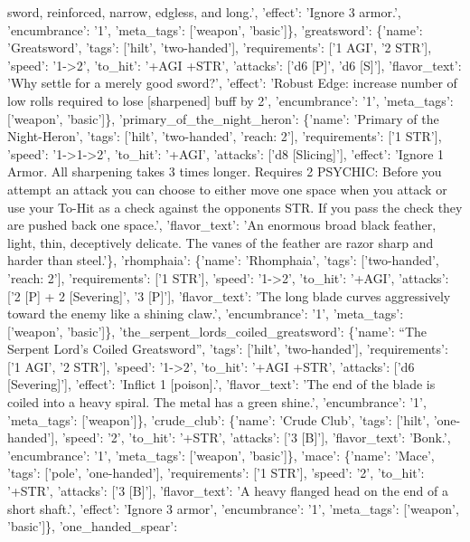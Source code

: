 \documentclass[
  letterpaper,
  DIV=11,
  numbers=noendperiod]{scrartcl}
\begin{document}
{sword, reinforced, narrow, edgless, and long.', 'effect': 'Ignore 3
armor.', 'encumbrance': '1', 'meta\_tags': {[}'weapon', 'basic'{]}\},
'greatsword': \{'name': 'Greatsword', 'tags': {[}'hilt',
'two-handed'{]}, 'requirements': {[}'1 AGI', '2 STR'{]}, 'speed':
'1-\textgreater2', 'to\_hit': '+AGI +STR', 'attacks': {[}'d6 {[}P{]}',
'd6 {[}S{]}'{]}, 'flavor\_text': 'Why settle for a merely good sword?',
'effect': 'Robust Edge: increase number of low rolls required to lose
{[}sharpened{]} buff by 2', 'encumbrance': '1', 'meta\_tags':
{[}'weapon', 'basic'{]}\}, 'primary\_of\_the\_night\_heron': \{'name':
'Primary of the Night-Heron', 'tags': {[}'hilt', 'two-handed', 'reach:
2'{]}, 'requirements': {[}'1 STR'{]}, 'speed':
'1-\textgreater1-\textgreater2', 'to\_hit': '+AGI', 'attacks': {[}'d8
{[}Slicing{]}'{]}, 'effect': 'Ignore 1 Armor. All sharpening takes 3
times longer. Requires 2 PSYCHIC: Before you attempt an attack you can
choose to either move one space when you attack or use your To-Hit as a
check against the opponents STR. If you pass the check they are pushed
back one space.', 'flavor\_text': 'An enormous broad black feather,
light, thin, deceptively delicate. The vanes of the feather are razor
sharp and harder than steel.'\}, 'rhomphaia': \{'name': 'Rhomphaia',
'tags': {[}'two-handed', 'reach: 2'{]}, 'requirements': {[}'1 STR'{]},
'speed': '1-\textgreater2', 'to\_hit': '+AGI', 'attacks': {[}'2 {[}P{]}
+ 2 {[}Severing{]}', '3 {[}P{]}'{]}, 'flavor\_text': 'The long blade
curves aggressively toward the enemy like a shining claw.',
'encumbrance': '1', 'meta\_tags': {[}'weapon', 'basic'{]}\},
'the\_serpent\_lords\_coiled\_greatsword': \{'name': ``The Serpent
Lord's Coiled Greatsword'', 'tags': {[}'hilt', 'two-handed'{]},
'requirements': {[}'1 AGI', '2 STR'{]}, 'speed': '1-\textgreater2',
'to\_hit': '+AGI +STR', 'attacks': {[}'d6 {[}Severing{]}'{]}, 'effect':
'Inflict 1 {[}poison{]}.', 'flavor\_text': 'The end of the blade is
coiled into a heavy spiral. The metal has a green shine.',
'encumbrance': '1', 'meta\_tags': {[}'weapon'{]}\}, 'crude\_club':
\{'name': 'Crude Club', 'tags': {[}'hilt', 'one-handed'{]}, 'speed':
'2', 'to\_hit': '+STR', 'attacks': {[}'3 {[}B{]}'{]}, 'flavor\_text':
'Bonk.', 'encumbrance': '1', 'meta\_tags': {[}'weapon', 'basic'{]}\},
'mace': \{'name': 'Mace', 'tags': {[}'pole', 'one-handed'{]},
'requirements': {[}'1 STR'{]}, 'speed': '2', 'to\_hit': '+STR',
'attacks': {[}'3 {[}B{]}'{]}, 'flavor\_text': 'A heavy flanged head on
the end of a short shaft.', 'effect': 'Ignore 3 armor', 'encumbrance':
'1', 'meta\_tags': {[}'weapon', 'basic'{]}\}, 'one\_handed\_spear':
}
\end{document}

